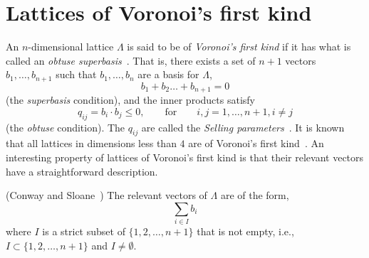 \documentclass[final,leqno]{siamltex}
\begin{document}
\section{Lattices of Voronoi's first kind} \label{sec:latt-voron-first}

An $n$-dimensional lattice $\Lambda$ is said to be of \emph{Voronoi's first kind} if it has what is called an \emph{obtuse superbasis}~\cite{ConwaySloane1992_voronoi_lattice_3d_obtuse_superbases}.  That is, there exists a set of $n+1$ vectors $b_1,\dots,b_{n+1}$ such that $b_1,\dots,b_n$ are a basis for $\Lambda$,
\begin{equation}\label{eq:superbasecond}
b_1 + b_2 \dots + b_{n+1} = 0
\end{equation}
(the \emph{superbasis} condition), and the inner products satisfy
\begin{equation}\label{eq:obtusecond}
q_{ij} = b_i \cdot b_j \leq 0, \qquad \text{for} \qquad i,j = 1,\dots,n+1, i \neq j
\end{equation}
(the \emph{obtuse} condition).  The $q_{ij}$ are called the \emph{Selling parameters}~\cite{Selling1874}.  It is known that all lattices in dimensions less than $4$ are of Voronoi's first kind~\cite{ConwaySloane1992_voronoi_lattice_3d_obtuse_superbases}.  An interesting property of lattices of Voronoi's first kind is that their relevant vectors have a straightforward description.

\begin{theorem} \label{thm:revvecssuperbase} (Conway and Sloane~\cite[Theorem~3]{ConwaySloane1992_voronoi_lattice_3d_obtuse_superbases})
The relevant vectors of $\Lambda$ are of the form,
\[
\sum_{i \in I} b_i
\]
where $I$ is a strict subset of $\{1, 2, \dots, n+1\}$ that is not empty, i.e., $I \subset \{1, 2, \dots, n+1\}$ and $I \neq \emptyset$.
\end{theorem}  
 
\end{document}
